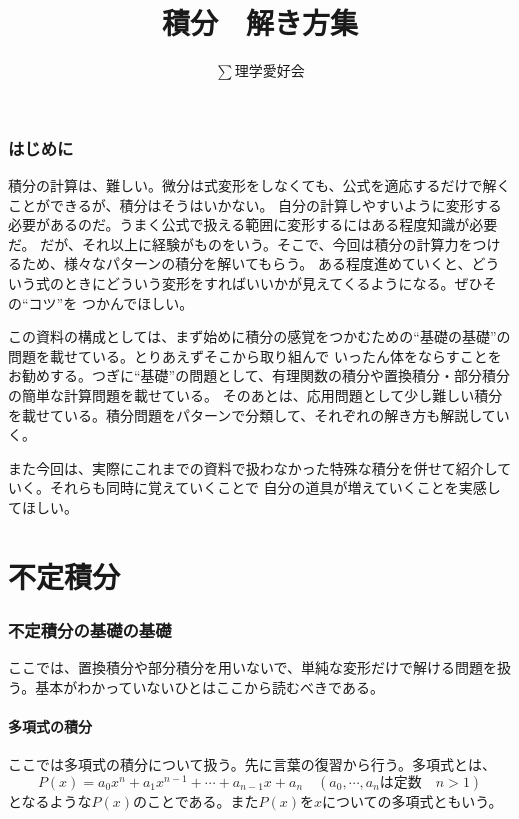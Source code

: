 \documentclass[a4j,dvipdfmx]{jsarticle}
\title{積分　解き方集}
\author{$\sum$理学愛好会}
\date{}
\begin{document}
\maketitle
\section{はじめに}
積分の計算は、難しい。微分は式変形をしなくても、公式を適応するだけで解くことができるが、積分はそうはいかない。
自分の計算しやすいように変形する必要があるのだ。うまく公式で扱える範囲に変形するにはある程度知識が必要だ。
だが、それ以上に経験がものをいう。そこで、今回は積分の計算力をつけるため、様々なパターンの積分を解いてもらう。
ある程度進めていくと、どういう式のときにどういう変形をすればいいかが見えてくるようになる。ぜひその``コツ''を
つかんでほしい。

この資料の構成としては、まず始めに積分の感覚をつかむための``基礎の基礎''の問題を載せている。とりあえずそこから取り組んで
いったん体をならすことをお勧めする。つぎに``基礎''の問題として、有理関数の積分や置換積分・部分積分の簡単な計算問題を載せている。
そのあとは、応用問題として少し難しい積分を載せている。積分問題をパターンで分類して、それぞれの解き方も解説していく。

また今回は、実際にこれまでの資料で扱わなかった特殊な積分を併せて紹介していく。それらも同時に覚えていくことで
自分の道具が増えていくことを実感してほしい。


\newpage
\tableofcontents
\clearpage

\part{不定積分}
\section{不定積分の基礎の基礎}
ここでは、置換積分や部分積分を用いないで、単純な変形だけで解ける問題を扱う。基本がわかっていないひとはここから読むべきである。
\subsection{多項式の積分}
ここでは多項式の積分について扱う。先に言葉の復習から行う。多項式とは、
\begin{equation*}
    P(x)=a_0 x^n +a_1 x^{n-1} +\cdots+a_{n-1}x+a_n\quad(\text{$a_0,\cdots,a_n$は定数　$n>1$})
\end{equation*}
となるような$P(x)$のことである。また$P(x)$を$x$についての多項式ともいう。
\end{document}
